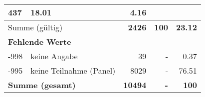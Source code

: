 \begin{longtable}{lXrrr}
       \num{437} &
       \num[round-mode=places,round-precision=2]{18,01} &
         \num[round-mode=places,round-precision=2]{4,16} \\
     \midrule
     \multicolumn{2}{l}{Summe (gültig)} &
       \textbf{\num{2426}} &
     \textbf{100} &
       \textbf{\num[round-mode=places,round-precision=2]{23,12}} \\
     \multicolumn{5}{l}{\textbf{Fehlende Werte}}\\
       -998 &
       keine Angabe &
         \num{39} &
        - &
         \num[round-mode=places,round-precision=2]{0,37} \\
       -995 &
       keine Teilnahme (Panel) &
         \num{8029} &
        - &
         \num[round-mode=places,round-precision=2]{76,51} \\
     \midrule
     \multicolumn{2}{l}{\textbf{Summe (gesamt)}} &
          \textbf{\num{10494}} &
        \textbf{-} &
        \textbf{100} \\
     \bottomrule
     \end{longtable}
     
